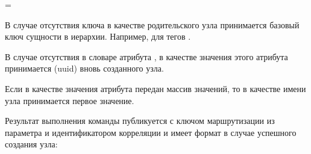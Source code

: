 \documentclass[a4paper,10pt,russian]{sphinxmanual}
\begin{document}
\begin{fulllineitems}
\sphinxAtStartPar
{} =

\begin{sphinxVerbatim}[commandchars=\\\{\}]
\end{sphinxVerbatim}

\sphinxAtStartPar
В случае отсутствия ключа  в качестве родительского узла
принимается базовый ключ сущности в иерархии. Например, для тегов \sphinxhyphen{}
.

\sphinxAtStartPar
В случае отсутствия в словаре атрибута , в качестве значения
этого атрибута принимается  (uuid) вновь созданного узла.

\sphinxAtStartPar
Если в качестве значения атрибута  передан массив значений, то
в качестве имени узла принимается первое значение.

\sphinxAtStartPar
Результат выполнения команды публикуется с ключом маршрутизации из
параметра  и идентификатором корреляции
 и имеет формат  в случае
успешного создания узла:

\begin{sphinxVerbatim}[commandchars=\\\{\}]
\end{sphinxVerbatim}


\end{fulllineitems}
\end{document}
